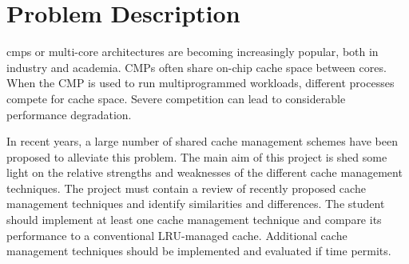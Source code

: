 
\section*{Problem Description}
\glspl{cmp} or multi-core architectures are becoming increasingly popular, both in industry and academia. 
CMPs often share on-chip cache space between cores. 
When the CMP is used to run multiprogrammed workloads, different processes compete for cache space. 
Severe competition can lead to considerable performance degradation. 

In recent years, a large number of shared cache management schemes have been proposed to alleviate this problem.
The main aim of this project is shed some light on the relative strengths and weaknesses of the different cache management techniques. 
The project must contain a review of recently proposed cache management techniques and identify similarities and differences. 
The student should implement at least one cache management technique and compare its performance to a conventional LRU-managed cache.
Additional cache management techniques should be implemented and evaluated if time permits.

\clearpage